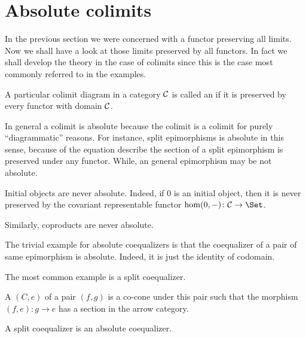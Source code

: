 \newpage\section{Absolute colimits}
  In the previous section we were concerned with a functor preserving all limits. Now we shall have a look at those limits preserved by all functors. In fact we shall develop the theory in the case of colimits since this is the case most commonly referred to in the examples.
  \begin{defn}
    A particular colimit diagram in a category ${\cal C}$ is called an  if it is preserved by every functor with domain ${\cal C}$.
  \end{defn}
  In general a colimit is absolute because the colimit is a colimit for purely ``diagrammatic'' reasons. For instance, split epimorphisms is absolute in this sense, because of the equation describe the section of a split epimorphism is preserved under any functor. While, an general epimorphism may be not absolute.
  \begin{exam}
    Initial objects are never absolute. Indeed, if $0$ is an initial object, then it is never preserved by the covariant representable functor $\hom(0,-)\colon\Cc\to\Set$.
  \end{exam}
  \begin{exam}
    Similarly, coproducts are never absolute.
  \end{exam}
  \begin{exam}
    The trivial example for absolute coequalizers is that the coequalizer of a pair of same epimorphism is absolute. Indeed, it is just the identity of codomain.
  \end{exam}
  The most common example is a split coequalizer.
  \begin{defn}
    A  $(C,e)$ of a pair $(f,g)$ is a co-cone under this pair such that the morphism $(f,e)\colon g\to e$ has a section in the arrow category.
  \end{defn}
  \begin{prop}\label{prop:split coeq is abs}
    A split coequalizer is an absolute coequalizer.
  \end{prop}
